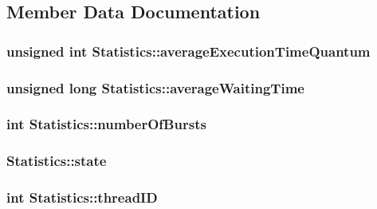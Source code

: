\subsection{Member Data Documentation}
\hypertarget{structStatistics_a69a377cee18cdf24f47592504ba607ee}{
\subsubsection[{average\-Execution\-Time\-Quantum}]{\setlength{\rightskip}{0pt plus 5cm}unsigned int Statistics\-::average\-Execution\-Time\-Quantum}}\label{structStatistics_a69a377cee18cdf24f47592504ba607ee}
\hypertarget{structStatistics_ab6750dc913f6b98057167637930617c8}{
\subsubsection[{average\-Waiting\-Time}]{\setlength{\rightskip}{0pt plus 5cm}unsigned long Statistics\-::average\-Waiting\-Time}}\label{structStatistics_ab6750dc913f6b98057167637930617c8}
\hypertarget{structStatistics_aecbead175661a5b03a0a80d492e1bad4}{
\subsubsection[{number\-Of\-Bursts}]{\setlength{\rightskip}{0pt plus 5cm}int Statistics\-::number\-Of\-Bursts}}\label{structStatistics_aecbead175661a5b03a0a80d492e1bad4}
\hypertarget{structStatistics_a1ae3df783f2d75732c9832265532150d}{
\subsubsection[{state}]{ Statistics\-::state}}\label{structStatistics_a1ae3df783f2d75732c9832265532150d}
\hypertarget{structStatistics_a9d680436e74c07fba13fcaba9671784f}{
\subsubsection[{thread\-I\-D}]{\setlength{\rightskip}{0pt plus 5cm}int Statistics\-::thread\-I\-D}}\label{structStatistics_a9d680436e74c07fba13fcaba9671784f}
